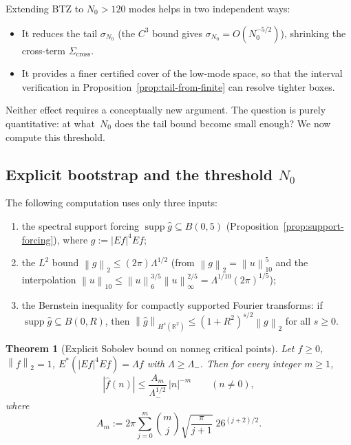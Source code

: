 \documentclass[12pt]{article}
\newtheorem{theorem}{Theorem}[section]
\theoremstyle{definition}
\theoremstyle{remark}
\DeclareMathOperator{\supp}{supp}
\newcommand{\R}{\mathbb{R}}
\newcommand{\wh}{\widehat}
\newcommand{\norm}[1]{\left\|#1\right\|}
\begin{document}
Extending BTZ to $N_0>120$ modes helps in two independent ways:
\begin{itemize}
  \item It reduces the tail $\sigma_{N_0}$ (the $C^3$ bound gives
    $\sigma_{N_0}=O(N_0^{-5/2})$), shrinking the cross-term
    $\Sigma_{\mathrm{cross}}$.
  \item It provides a finer certified cover of the low-mode space, so
    that the interval verification in Proposition~\ref{prop:tail-from-finite}
    can resolve tighter boxes.
\end{itemize}
Neither effect requires a conceptually new argument.  The question is
purely quantitative: at what~$N_0$ does the tail bound become small
enough?  We now compute this threshold.


\subsection{Explicit bootstrap and the threshold $N_0$}
\label{sec:explicit-bootstrap}

The following computation uses only three inputs:
\begin{enumerate}[label=(\roman*),leftmargin=2em]
  \item the spectral support forcing $\supp\wh g\subseteq B(0,5)$
    (Proposition~\ref{prop:support-forcing}), where $g:=|Ef|^4Ef$;
  \item the $L^2$ bound $\norm{g}_2\leq(2\pi)\Lambda^{1/2}$
    (from $\norm{g}_2=\norm{u}_{10}^5$ and the interpolation
    $\norm{u}_{10}\leq\norm{u}_6^{3/5}\norm{u}_\infty^{2/5}
    =\Lambda^{1/10}(2\pi)^{1/5}$);
  \item the Bernstein inequality for compactly supported Fourier
    transforms: if $\supp\wh g\subseteq B(0,R)$, then
    $\norm{\wh g}_{H^s(\R^2)}\leq(1+R^2)^{s/2}\norm{g}_2$
    for all $s\geq 0$.
\end{enumerate}

\begin{theorem}[Explicit Sobolev bound on nonneg critical points]
  \label{thm:explicit-sobolev}
  Let $f\geq 0$, $\norm{f}_2=1$, $E^*(|Ef|^4Ef)=\Lambda f$ with
  $\Lambda\geq\Lambda_-$.  Then for every integer $m\geq 1$,
  \begin{equation}\label{eq:explicit-sobolev}
    |\wh f(n)|
    \leq
    \frac{A_m}{\Lambda_-^{1/2}}\,|n|^{-m}
    \qquad(n\neq 0),
  \end{equation}
  where
  \begin{equation}\label{eq:Am-def}
    A_m
    :=
    2\pi
    \sum_{j=0}^{m}\binom{m}{j}
    \sqrt{\frac{\pi}{j+1}}\;26^{(j+2)/2}.
  \end{equation}
\end{theorem}
\end{document}
